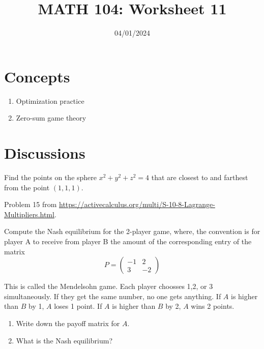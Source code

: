 \documentclass[12pt]{amsart}
\title{ MATH 104: Worksheet 11}
\author{}
\date{04/01/2024}
\begin{document}
\maketitle


\section{Concepts}

\begin{enumerate}
    \item Optimization practice
    \item Zero-sum  game theory
\end{enumerate}

\section{Discussions}


\begin{problem}
         Find the points on the sphere $x^2 + y^2 + z^2 =4$
            that are closest to and farthest from the point 
            $(1,1,1)$.
\end{problem}

\begin{problem}
        Problem 15 from \url{https://activecalculus.org/multi/S-10-8-Lagrange-Multipliers.html}.
\end{problem}


\begin{problem}
    Compute the Nash equilibrium for the 2-player game, where, the convention is for player 
    A to receive from player B the amount of the corresponding entry of the matrix
    \begin{equation*}
        P = 
        \begin{pmatrix}
            -1 & 2 \\ 3 & -2
        \end{pmatrix}
    \end{equation*}
\end{problem}

\begin{problem}
    This is called the Mendelsohn game.
    Each player choosses 1,2, or 3 simultaneously.
    If they get the same number, no one gets anything.
    If $A$ is higher than $B$ by 1, $A$ loses 1 point.
    If $A$ is higher than $B$ by 2, $A$ wins 2 points.

    \begin{enumerate}
        \item Write down the payoff matrix for $A$.
        \item What is the Nash equilibrium?
    \end{enumerate}
\end{problem}
\end{document}
